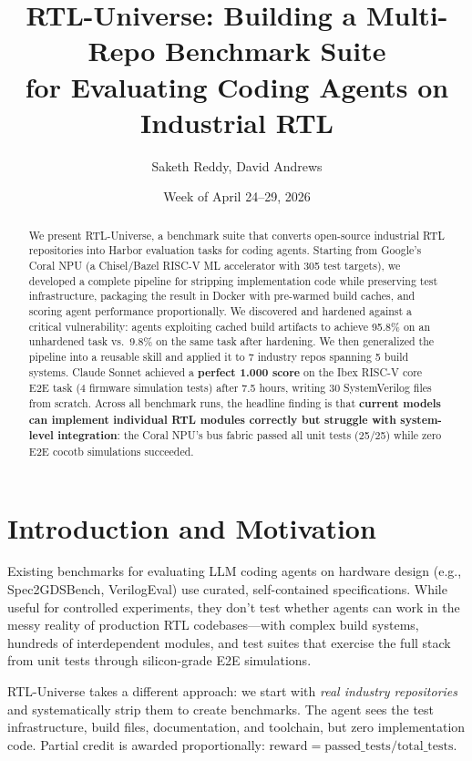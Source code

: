 \documentclass[11pt,a4paper]{article}
\title{RTL-Universe: Building a Multi-Repo Benchmark Suite\\for Evaluating Coding Agents on Industrial RTL}
\author{Saketh Reddy, David Andrews}
\date{Week of April 24--29, 2026}
\begin{document}
\maketitle

\begin{abstract}
We present RTL-Universe, a benchmark suite that converts open-source industrial RTL repositories into Harbor evaluation tasks for coding agents. Starting from Google's Coral NPU (a Chisel/Bazel RISC-V ML accelerator with 305 test targets), we developed a complete pipeline for stripping implementation code while preserving test infrastructure, packaging the result in Docker with pre-warmed build caches, and scoring agent performance proportionally. We discovered and hardened against a critical vulnerability: agents exploiting cached build artifacts to achieve 95.8\% on an unhardened task vs.\ 9.8\% on the same task after hardening. We then generalized the pipeline into a reusable skill and applied it to 7 industry repos spanning 5 build systems. Claude Sonnet achieved a \textbf{perfect 1.000 score} on the Ibex RISC-V core E2E task (4 firmware simulation tests) after 7.5 hours, writing 30 SystemVerilog files from scratch. Across all benchmark runs, the headline finding is that \textbf{current models can implement individual RTL modules correctly but struggle with system-level integration}: the Coral NPU's bus fabric passed all unit tests (25/25) while zero E2E cocotb simulations succeeded.
\end{abstract}

\section{Introduction and Motivation}

Existing benchmarks for evaluating LLM coding agents on hardware design (e.g., Spec2GDSBench, VerilogEval) use curated, self-contained specifications. While useful for controlled experiments, they don't test whether agents can work in the messy reality of production RTL codebases---with complex build systems, hundreds of interdependent modules, and test suites that exercise the full stack from unit tests through silicon-grade E2E simulations.

RTL-Universe takes a different approach: we start with \emph{real industry repositories} and systematically strip them to create benchmarks. The agent sees the test infrastructure, build files, documentation, and toolchain, but zero implementation code. Partial credit is awarded proportionally: $\text{reward} = \text{passed\_tests} / \text{total\_tests}$.
\end{document}
